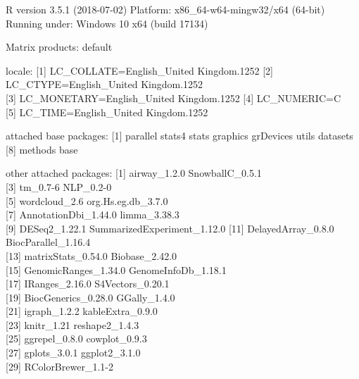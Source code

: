 \documentclass[9pt,a4paper,]{extarticle}
\begin{document}
R version 3.5.1 (2018-07-02)
Platform: x86\_64-w64-mingw32/x64 (64-bit)
Running under: Windows 10 x64 (build 17134)

Matrix products: default

locale:
{[}1{]} LC\_COLLATE=English\_United Kingdom.1252
{[}2{]} LC\_CTYPE=English\_United Kingdom.1252\\
{[}3{]} LC\_MONETARY=English\_United Kingdom.1252
{[}4{]} LC\_NUMERIC=C\\
{[}5{]} LC\_TIME=English\_United Kingdom.1252

attached base packages:
{[}1{]} parallel stats4 stats graphics grDevices utils datasets
{[}8{]} methods base

other attached packages:
{[}1{]} airway\_1.2.0 SnowballC\_0.5.1\\
{[}3{]} tm\_0.7-6 NLP\_0.2-0\\
{[}5{]} wordcloud\_2.6 org.Hs.eg.db\_3.7.0\\
{[}7{]} AnnotationDbi\_1.44.0 limma\_3.38.3\\
{[}9{]} DESeq2\_1.22.1 SummarizedExperiment\_1.12.0
{[}11{]} DelayedArray\_0.8.0 BiocParallel\_1.16.4\\
{[}13{]} matrixStats\_0.54.0 Biobase\_2.42.0\\
{[}15{]} GenomicRanges\_1.34.0 GenomeInfoDb\_1.18.1\\
{[}17{]} IRanges\_2.16.0 S4Vectors\_0.20.1\\
{[}19{]} BiocGenerics\_0.28.0 GGally\_1.4.0\\
{[}21{]} igraph\_1.2.2 kableExtra\_0.9.0\\
{[}23{]} knitr\_1.21 reshape2\_1.4.3\\
{[}25{]} ggrepel\_0.8.0 cowplot\_0.9.3\\
{[}27{]} gplots\_3.0.1 ggplot2\_3.1.0\\
{[}29{]} RColorBrewer\_1.1-2
\end{document}
